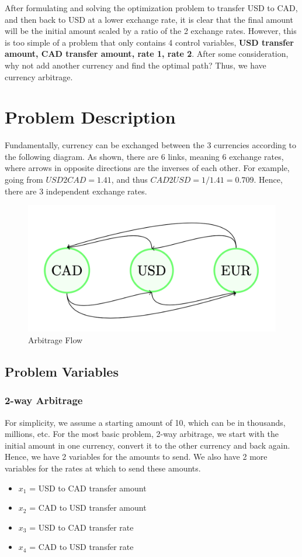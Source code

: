 \documentclass[12pt]{article}
\begin{document}
After formulating and solving the optimization problem to transfer USD to CAD, and then back to USD at a lower exchange rate, it is clear that the final amount will be the initial amount scaled by a ratio of the 2 exchange rates. However, this is too simple of a problem that only contains 4 control variables, \textbf{USD transfer amount, CAD transfer amount, rate 1, rate 2}. After some consideration, why not add another currency and find the optimal path? Thus, we have currency arbitrage.

\section{Problem Description}
Fundamentally, currency can be exchanged between the 3 currencies according to the following diagram. As shown, there are 6 links, meaning 6 exchange rates, where arrows in opposite directions are the inverses of each other. For example, going from $USD2CAD = 1.41$, and thus $CAD2USD = 1/1.41 = 0.709$. Hence, there are 3 independent exchange rates.

\begin{figure}[H]
    \centering
    \includegraphics[width=.5\linewidth]{figures/flow}
    \caption{Arbitrage Flow}
    \label{fig:flow}
\end{figure}

\subsection{Problem Variables}
\subsubsection{2-way Arbitrage}
For simplicity, we assume a starting amount of 10, which can be in thousands, millions, etc. For the most basic problem, 2-way arbitrage, we start with the initial amount in one currency, convert it to the other currency and back again. Hence, we have 2 variables for the amounts to send. We also have 2 more variables for the rates at which to send these amounts. 
\begin{itemize}
	\item $x_{1}$ = USD to CAD transfer amount
	\item $x_{2}$ = CAD to USD transfer amount
	\item $x_{3}$ = USD to CAD transfer rate
	\item $x_{4}$ = CAD to USD transfer rate
\end{itemize}
\end{document}
